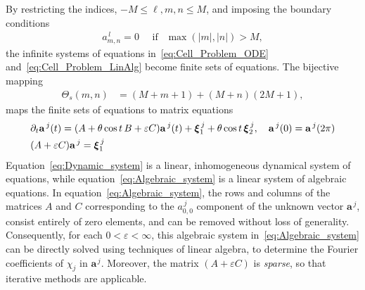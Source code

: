 \documentclass{article}
\newcommand{\vecxi}{\mbox{\boldmath${\xi}$}}
\newcommand{\veca}{\mathbf{a}}
\begin{document}
By restricting the indices, $-M\leq \ell,m,n\leq M$, and imposing the boundary
conditions
%
\begin{align}
  a^{\,l}_{m,n}=0 \quad \text{ if } \ \ \max(|m|,|n|)>M,
\end{align}
%
the infinite systems of equations in~\eqref{eq:Cell_Problem_ODE}
and~\eqref{eq:Cell_Problem_LinAlg} become finite sets of
equations. The bijective mapping
% 
\begin{align}\label{eq:Bijections} 
  \Theta_s(m,n)&=(M+m+1)+(M+n)(2M+1), 
\end{align}
%
maps the finite sets of equations to matrix equations
%
\begin{align}
  \label{eq:Dynamic_system}
  &\partial_t\veca^{\,j}(t)=(A+\theta\cos{t}\,B+\varepsilon C)\veca^{\,j}(t)
             +\vecxi_1^{\,j}+\theta\cos{t}\,\vecxi_2^{\,j},
   \quad
   \veca^{\,j}(0)=\veca^{\,j}(2\pi)
   \\
   \label{eq:Algebraic_system}
  &(A+\varepsilon C)\veca^{\,j}=\vecxi_1^{\,j}
\end{align}
%
Equation~\eqref{eq:Dynamic_system} is a linear, inhomogeneous
dynamical system of equations, while
equation~\eqref{eq:Algebraic_system} is a linear system of algebraic
equations. In equation~\eqref{eq:Algebraic_system}, the rows and
columns of the matrices $A$ and $C$ corresponding to the
$a^{\,j}_{0,0}$ component of the unknown vector $\veca^{\,j}$,
consist entirely of zero elements, and can be removed without loss of 
generality. Consequently, for each $0<\varepsilon<\infty$, this algebraic system
in~\eqref{eq:Algebraic_system} can be directly solved using techniques
of linear algebra, to determine the Fourier coefficients of $\chi_j$ in
$\veca^{\,j}$. Moreover, the matrix $(A+\varepsilon C)$ is \emph{sparse}, so
that iterative methods are applicable.   


 
\end{document}
